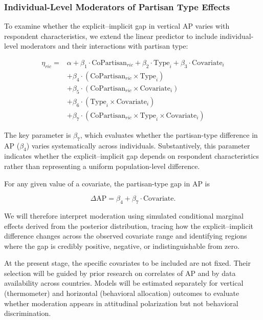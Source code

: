 \documentclass[
  12pt,
  a4paper,
  DIV=11,
  numbers=noendperiod]{scrartcl}
\begin{document}
\subsubsection{Individual-Level Moderators of Partisan Type
Effects}\label{sec-moderators}

To examine whether the explicit--implicit gap in vertical AP varies with
respondent characteristics, we extend the linear predictor to include
individual-level moderators and their interactions with partisan type:

\[
\begin{aligned}
\eta_{ric} = &\alpha + \beta_1 \cdot \text{CoPartisan}_{ric} + \beta_2 \cdot \text{Type}_i + \beta_3 \cdot \text{Covariate}_i \\
&+ \beta_4 \cdot (\text{CoPartisan}_{ric} \times \text{Type}_i) \\
&+ \beta_5 \cdot (\text{CoPartisan}_{ric} \times \text{Covariate}_i) \\
&+ \beta_6 \cdot (\text{Type}_i \times \text{Covariate}_i) \\
&+ \beta_7 \cdot (\text{CoPartisan}_{ric} \times \text{Type}_i \times \text{Covariate}_i)
\end{aligned}
\]

The key parameter is \(\beta_7\), which evaluates whether the
partisan-type difference in AP (\(\beta_4\)) varies systematically
across individuals. Substantively, this parameter indicates whether the
explicit--implicit gap depends on respondent characteristics rather than
representing a uniform population-level difference.

For any given value of a covariate, the partisan-type gap in AP is

\[
\Delta \text{AP} = \beta_4 + \beta_7 \cdot \text{Covariate}.
\]

We will therefore interpret moderation using simulated conditional
marginal effects derived from the posterior distribution, tracing how
the explicit--implicit difference changes across the observed covariate
range and identifying regions where the gap is credibly positive,
negative, or indistinguishable from zero.

At the present stage, the specific covariates to be included are not
fixed. Their selection will be guided by prior research on correlates of
AP and by data availability across countries. Models will be estimated
separately for vertical (thermometer) and horizontal (behavioral
allocation) outcomes to evaluate whether moderation appears in
attitudinal polarization but not behavioral discrimination.
\end{document}
